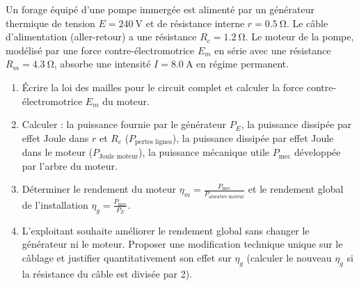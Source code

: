 \documentclass[11pt]{article}
\begin{document}
\begin{exercice}
Un forage équipé d'une pompe immergée est alimenté par un générateur thermique de tension $E = \SI{240}{\volt}$ et de résistance interne $r = \SI{0,5}{\ohm}$. Le câble d'alimentation (aller-retour) a une résistance $R_c = \SI{1,2}{\ohm}$. Le moteur de la pompe, modélisé par une force contre-électromotrice $E_m$ en série avec une résistance $R_m = \SI{4,3}{\ohm}$, absorbe une intensité $I = \SI{8,0}{\ampere}$ en régime permanent.
\begin{enumerate}
    \item Écrire la loi des mailles pour le circuit complet et calculer la force contre-électromotrice $E_m$ du moteur.
    \item Calculer : la puissance fournie par le générateur $P_E$, la puissance dissipée par effet Joule dans $r$ et $R_c$ ($P_{\text{pertes lignes}}$), la puissance dissipée par effet Joule dans le moteur ($P_{\text{Joule moteur}}$), la puissance mécanique utile $P_{\text{mec}}$ développée par l'arbre du moteur.
    \item Déterminer le rendement du moteur $\eta_m = \frac{P_{\text{mec}}}{P_{\text{absorbée moteur}}}$ et le rendement global de l'installation $\eta_g = \frac{P_{\text{mec}}}{P_E}$.
    \item L'exploitant souhaite améliorer le rendement global sans changer le générateur ni le moteur. Proposer une modification technique unique sur le câblage et justifier quantitativement son effet sur $\eta_g$ (calculer le nouveau $\eta_g$ si la résistance du câble est divisée par 2).
\end{enumerate}
\end{exercice}
\end{document}

